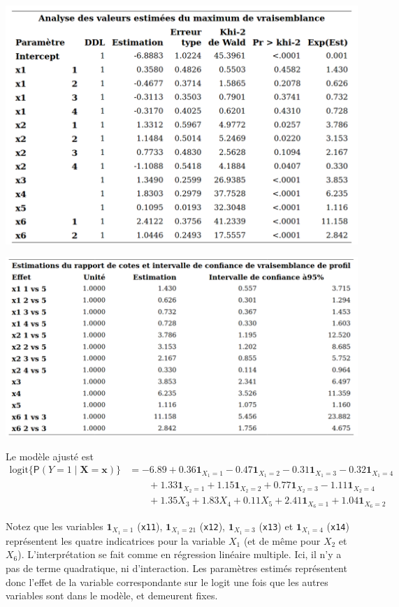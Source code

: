 \documentclass[
  11pt,
  letterpaper,
]{book}
\theoremstyle{definition}
\theoremstyle{definition}
\theoremstyle{definition}
\theoremstyle{remark}
\begin{document}
\begin{center}\includegraphics[width=0.9\linewidth]{figures/03-logistic-e7} \end{center}

\begin{center}\includegraphics[width=1\linewidth]{figures/03-logistic-e8} \end{center}

Le modèle ajusté est
\begin{align*}
 \mathrm{logit}\{{\mathsf P}\left(Y=1 \mid \boldsymbol{X}=\boldsymbol{x}\right)\} &= -6.89 + 0.36{\mathbf 1}_{X_1=1} - 0.47{\mathbf 1}_{X_1=2} - 0.31{\mathbf 1}_{X_1=3} - 0.32{\mathbf 1}_{X_1=4} \\& \qquad 
+ 1.33{\mathbf 1}_{X_2=1} + 1.15{\mathbf 1}_{X_2=2} + 0.77{\mathbf 1}_{X_2=3} - 1.11{\mathbf 1}_{X_2=4} \\&\qquad 
+ 1.35X_3+ 1.83X_4
+ 0.11X_5
+ 2.41{\mathbf 1}_{X_6=1} + 1.04{\mathbf 1}_{X_6=2}
\end{align*}

Notez que les variables \({\mathbf 1}_{X_1=1}\) (\texttt{x11}), \({\mathbf 1}_{X_1=21}\) (\texttt{x12}), \({\mathbf 1}_{X_1=3}\) (\texttt{x13}) et \({\mathbf 1}_{X_1=4}\) (\texttt{x14}) représentent les quatre indicatrices pour la variable \(X_1\) (et de même pour \(X_2\) et \(X_6\)). L'interprétation se fait comme en régression linéaire multiple. Ici, il n'y a pas de terme quadratique, ni d'interaction. Les paramètres estimés représentent donc l'effet de la variable correspondante sur le logit une fois que les autres variables sont dans le modèle, et demeurent fixes.
\end{document}
